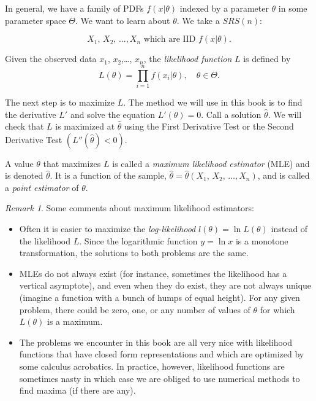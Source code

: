 \documentclass[]{book}
\providecommand{\tightlist}{%
  \setlength{\itemsep}{0pt}\setlength{\parskip}{0pt}}
\numberwithin{equation}{chapter}
\numberwithin{figure}{chapter}
\theoremstyle{plain}
\theoremstyle{definition}
\theoremstyle{remark}
\theoremstyle{definition}
\theoremstyle{definition}
\theoremstyle{remark}
\newtheorem*{remark}{Remark}
\let\BeginKnitrBlock\begin \let\EndKnitrBlock\end
\begin{document}
In general, we have a family of PDFs \(f(x|\theta)\) indexed by a
parameter \(\theta\) in some parameter space \(\Theta\). We want to
learn about \(\theta\). We take a \(SRS(n)\):

\begin{equation}
X_{1},\, X_{2},\,\ldots,X_{n}\mbox{ which are IID \(f(x| \theta )\).}
\end{equation}

\bigskip

\BeginKnitrBlock{definition}
\protect\hypertarget{def:unnamed-chunk-379}{}{\label{def:unnamed-chunk-379}}Given
the observed data \(x_{1}\), \(x_{2}\),\ldots{}, \(x_{n}\), the
\emph{likelihood function} \(L\) is defined by \[
L(\theta)=\prod_{i=1}^{n}f(x_{i}|\theta),\quad \theta\in\Theta.  \]
\EndKnitrBlock{definition}

The next step is to maximize \(L\). The method we will use in this book
is to find the derivative \(L'\) and solve the equation
\(L'(\theta)=0\). Call a solution \(\hat{\theta}\). We will check that
\(L\) is maximized at \(\hat{\theta}\) using the First Derivative Test
or the Second Derivative Test \(\left(L''(\hat{\theta})<0\right)\).

\bigskip

\BeginKnitrBlock{definition}
\protect\hypertarget{def:unnamed-chunk-380}{}{\label{def:unnamed-chunk-380}}A
value \(\theta\) that maximizes \(L\) is called a \emph{maximum
likelihood estimator} (MLE) and is denoted \(\hat{\theta}\). It is a
function of the sample,
\(\hat{\theta}=\hat{\theta}\left(X_{1},\, X_{2},\,\ldots,X_{n}\right)\),
and is called a \emph{point estimator} of \(\theta\).
\EndKnitrBlock{definition}

\bigskip

\begin{remark}
Some comments about maximum likelihood estimators:

\begin{itemize}
\tightlist
\item
  Often it is easier to maximize the \emph{log-likelihood}
  \(l(\theta)=\ln  L(\theta)\) instead of the likelihood \(L\). Since
  the logarithmic function \(y=\ln x\) is a monotone transformation, the
  solutions to both problems are the same.
\item
  MLEs do not always exist (for instance, sometimes the likelihood has a
  vertical asymptote), and even when they do exist, they are not always
  unique (imagine a function with a bunch of humps of equal height). For
  any given problem, there could be zero, one, or any number of values
  of \(\theta\) for which \(L(\theta)\) is a maximum.
\item
  The problems we encounter in this book are all very nice with
  likelihood functions that have closed form representations and which
  are optimized by some calculus acrobatics. In practice, however,
  likelihood functions are sometimes nasty in which case we are obliged
  to use numerical methods to find maxima (if there are any).
\end{itemize}
\end{remark}
\end{document}
